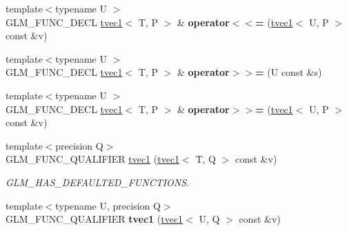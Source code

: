 \begin{DoxyCompactItemize}
\item 
\hypertarget{structglm_1_1tvec1_a2ed7c375c837621c846ee0b31104e34a}{{\footnotesize template$<$typename U $>$ }\\G\-L\-M\-\_\-\-F\-U\-N\-C\-\_\-\-D\-E\-C\-L \hyperlink{structglm_1_1tvec1}{tvec1}$<$ T, P $>$ \& {\bfseries operator$<$$<$=} (\hyperlink{structglm_1_1tvec1}{tvec1}$<$ U, P $>$ const \&v)}\label{structglm_1_1tvec1_a2ed7c375c837621c846ee0b31104e34a}

\item 
\hypertarget{structglm_1_1tvec1_a604466779f4723d65def8bff99bdde6a}{{\footnotesize template$<$typename U $>$ }\\G\-L\-M\-\_\-\-F\-U\-N\-C\-\_\-\-D\-E\-C\-L \hyperlink{structglm_1_1tvec1}{tvec1}$<$ T, P $>$ \& {\bfseries operator$>$$>$=} (U const \&s)}\label{structglm_1_1tvec1_a604466779f4723d65def8bff99bdde6a}

\item 
\hypertarget{structglm_1_1tvec1_ac7b30c3a71fc6b28c4bceae5a0e92057}{{\footnotesize template$<$typename U $>$ }\\G\-L\-M\-\_\-\-F\-U\-N\-C\-\_\-\-D\-E\-C\-L \hyperlink{structglm_1_1tvec1}{tvec1}$<$ T, P $>$ \& {\bfseries operator$>$$>$=} (\hyperlink{structglm_1_1tvec1}{tvec1}$<$ U, P $>$ const \&v)}\label{structglm_1_1tvec1_ac7b30c3a71fc6b28c4bceae5a0e92057}

\item 
\hypertarget{structglm_1_1tvec1_a70713b0e11c08f57bcd8ab7c58a78ab6}{{\footnotesize template$<$precision Q$>$ }\\G\-L\-M\-\_\-\-F\-U\-N\-C\-\_\-\-Q\-U\-A\-L\-I\-F\-I\-E\-R \hyperlink{structglm_1_1tvec1_a70713b0e11c08f57bcd8ab7c58a78ab6}{tvec1} (\hyperlink{structglm_1_1tvec1}{tvec1}$<$ T, Q $>$ const \&v)}\label{structglm_1_1tvec1_a70713b0e11c08f57bcd8ab7c58a78ab6}

\begin{DoxyCompactList}\small\item\em G\-L\-M\-\_\-\-H\-A\-S\-\_\-\-D\-E\-F\-A\-U\-L\-T\-E\-D\-\_\-\-F\-U\-N\-C\-T\-I\-O\-N\-S. \end{DoxyCompactList}\item 
\hypertarget{structglm_1_1tvec1_a5aac06a8cf1e08a8245e4fe9aeab4afb}{{\footnotesize template$<$typename U, precision Q$>$ }\\G\-L\-M\-\_\-\-F\-U\-N\-C\-\_\-\-Q\-U\-A\-L\-I\-F\-I\-E\-R {\bfseries tvec1} (\hyperlink{structglm_1_1tvec1}{tvec1}$<$ U, Q $>$ const \&v)}\label{structglm_1_1tvec1_a5aac06a8cf1e08a8245e4fe9aeab4afb}


\end{DoxyCompactItemize}
